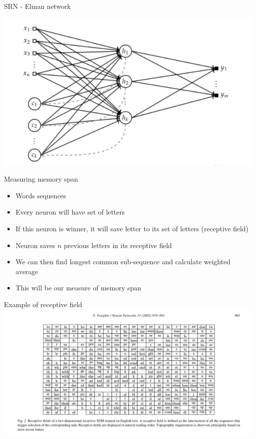 \documentclass[10pt]{beamer}
\begin{document}
\begin{frame}[fragile]{SRN - Elman network}

\includegraphics[width=\textwidth]{elman}

\end{frame}

\begin{frame}[fragile]{Measuring memory span}

\begin{itemize}
\item Words sequences
\item Every neuron will have set of letters
\item If this neuron is winner, it will save letter to its set of letters (receptive field)
\item Neuron saves $n$ previous letters in its receptive field
\item We can then find longest common sub-sequence and calculate weighted average
\item This will be our measure of memory span
\end{itemize}

\end{frame}

\begin{frame}[fragile]{Example of receptive field}
\includegraphics[width=\textwidth]{receptive_field}
\end{frame}
\end{document}
